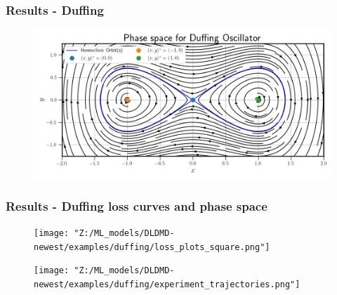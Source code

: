 \documentclass[11pt,aspectratio=169]{beamer}
\begin{document}
    \begin{frame}
        \frametitle{Results - Duffing}
        \begin{figure}
            \centering
            \includegraphics[width=\textwidth]{../Figures/duffing_phase_space.png}
        \end{figure}
    \end{frame}

    \begin{frame}
        \frametitle{Results - Duffing loss curves and phase space}
        \begin{figure}
            \centering
            \begin{minipage}{.5\textwidth}
                \texttt{[image: "Z:/ML\_models/DLDMD-newest/examples/duffing/loss\_plots\_square.png"]}
            \end{minipage}%
            \begin{minipage}{.5\textwidth}
                \texttt{[image: "Z:/ML\_models/DLDMD-newest/examples/duffing/experiment\_trajectories.png"]}
            \end{minipage}
        \end{figure}
    \end{frame}
    
\end{document}
